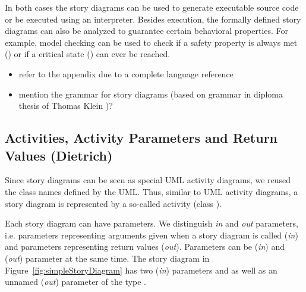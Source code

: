 
In both cases the story diagrams can be used to generate executable source code or be executed using an interpreter.
Besides execution, the formally defined story diagrams can also be analyzed to guarantee certain behavioral properties.
For example, model checking can be used to check if a safety property is always met () or if a critical state () can ever be reached.



\begin{itemize}
  \item refer to the appendix due to a complete language reference
  \item mention the grammar for story diagrams (based on grammar in diploma thesis of Thomas Klein \cite{Kle99})?
\end{itemize}


\subsection{Activities, Activity Parameters and Return Values (Dietrich)}

Since story diagrams can be seen as special UML activity diagrams, we reused the class names defined by the UML.
Thus, similar to UML activity diagrams, a story diagram is represented by a so-called activity (class ).

Each story diagram can have parameters.
We distinguish \emph{in} and \emph{out} parameters,
i.e. parameters representing arguments given when a story diagram is called (\emph{in})
and parameters representing return values (\emph{out}).
Parameters can be (\emph{in}) and (\emph{out}) parameter at the same time.
The story diagram in Figure~\ref{fig:simpleStoryDiagram} has two (\emph{in}) parameters  and 
as well as an unnamed (\emph{out}) parameter of the type .

